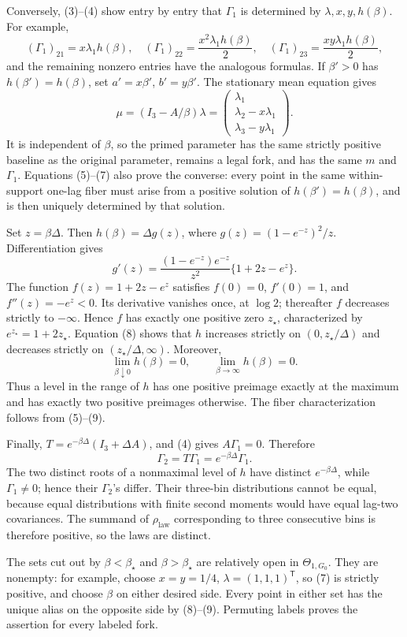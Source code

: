 Conversely, (3)--(4) show entry by entry that \(\Gamma_1\) is determined by \(\lambda,x,y,h(\beta)\).  For example,
\[
 (\Gamma_1)_{21}=x\lambda_1h(\beta),\quad
 (\Gamma_1)_{22}=\frac{x^2\lambda_1h(\beta)}2,\quad
 (\Gamma_1)_{23}=\frac{xy\lambda_1h(\beta)}2,
\]
and the remaining nonzero entries have the analogous formulas.  If \(\beta'>0\) has \(h(\beta')=h(\beta)\), set \(a'=x\beta'\), \(b'=y\beta'\).  The stationary mean equation gives
\[
 \mu=(I_3-A/\beta)\lambda
 =\begin{pmatrix}\lambda_1\\ \lambda_2-x\lambda_1\\ \lambda_3-y\lambda_1\end{pmatrix}. \tag{7}
\]
It is independent of \(\beta\), so the primed parameter has the same strictly positive baseline as the original parameter, remains a legal fork, and has the same \(m\) and \(\Gamma_1\).  Equations (5)--(7) also prove the converse: every point in the same within-support one-lag fiber must arise from a positive solution of \(h(\beta')=h(\beta)\), and is then uniquely determined by that solution.

Set \(z=\beta\Delta\).  Then \(h(\beta)=\Delta g(z)\), where \(g(z)=(1-e^{-z})^2/z\).  Differentiation gives
\[
 g'(z)=\frac{(1-e^{-z})e^{-z}}{z^2}\{1+2z-e^z\}.                \tag{8}
\]
The function \(f(z)=1+2z-e^z\) satisfies \(f(0)=0\), \(f'(0)=1\), and \(f''(z)=-e^z<0\).  Its derivative vanishes once, at \(\log2\); thereafter \(f\) decreases strictly to \(-\infty\).  Hence \(f\) has exactly one positive zero \(z_\star\), characterized by \(e^{z_\star}=1+2z_\star\).  Equation (8) shows that \(h\) increases strictly on \((0,z_\star/\Delta)\) and decreases strictly on \((z_\star/\Delta,\infty)\).  Moreover,
\[
 \lim_{\beta\downarrow0}h(\beta)=0,\qquad
 \lim_{\beta\to\infty}h(\beta)=0.                              \tag{9}
\]
Thus a level in the range of \(h\) has one positive preimage exactly at the maximum and has exactly two positive preimages otherwise.  The fiber characterization follows from (5)--(9).

Finally, \(T=e^{-\beta\Delta}(I_3+\Delta A)\), and (4) gives \(A\Gamma_1=0\).  Therefore
\[
 \Gamma_2=T\Gamma_1=e^{-\beta\Delta}\Gamma_1.                  \tag{10}
\]
The two distinct roots of a nonmaximal level of \(h\) have distinct \(e^{-\beta\Delta}\), while \(\Gamma_1\neq0\); hence their \(\Gamma_2\)'s differ.  Their three-bin distributions cannot be equal, because equal distributions with finite second moments would have equal lag-two covariances.  The summand of \(\rho_{\mathrm{law}}\) corresponding to three consecutive bins is therefore positive, so the laws are distinct.

The sets cut out by \(\beta<\beta_\star\) and \(\beta>\beta_\star\) are relatively open in \(\Theta_{1,G_0}\).  They are nonempty: for example, choose \(x=y=1/4\), \(\lambda=(1,1,1)^{\mathsf T}\), so (7) is strictly positive, and choose \(\beta\) on either desired side.  Every point in either set has the unique alias on the opposite side by (8)--(9).  Permuting labels proves the assertion for every labeled fork.